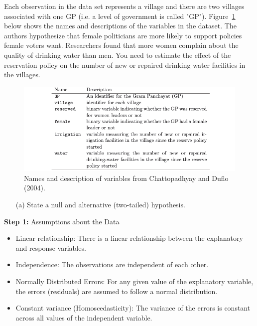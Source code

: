 \documentclass[12pt,letterpaper]{article}
\begin{document}
\noindent Each observation in the data set represents a village and there are two villages associated with one GP (i.e. a level of government is called "GP"). Figure~\ref{fig:women_desc} below shows the names and descriptions of the variables in the dataset. The authors hypothesize that female politicians are more likely to support policies female voters want. Researchers found that more women complain about the quality of drinking water than men. You need to estimate the effect of the reservation policy on the number of new or repaired drinking water facilities in the villages.
\vspace{.5cm}
\begin{figure}[h!]
	\caption{\footnotesize{Names and description of variables from Chattopadhyay and Duflo (2004).}}
	\vspace{.5cm}
	\centering
	\label{fig:women_desc}
	\includegraphics[width=1.1\textwidth]{women_desc.png}
\end{figure}		

\newpage
\begin{enumerate}
	\item [(a)] State a null and alternative (two-tailed) hypothesis. 
\end{enumerate}
\noindent\textbf{Step 1:} Assumptions about the Data
\begin{itemize}
	\item 
	Linear relationship: There is a linear relationship between the explanatory  and response variables.
	\item
	Independence: The observations are independent of each other.
	\item 
	Normally Distributed Errors: For any given value of the explanatory variable, the errors (residuals) are assumed to follow a normal distribution.
	\item 
	Constant variance (Homoscedasticity): The variance of the errors is constant across all values of the independent variable.
\end{itemize}
\end{document}
